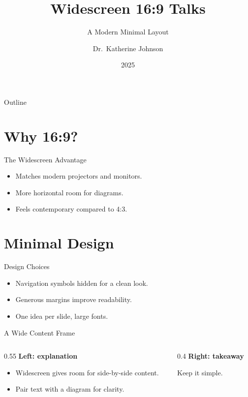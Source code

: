 \documentclass[aspectratio=169]{beamer}
\title{Widescreen 16:9 Talks}
\subtitle{A Modern Minimal Layout}
\author{Dr.~Katherine Johnson}
\institute{NASA}
\date{2025}
\begin{document}
\begin{frame}[plain]
  \titlepage
\end{frame}

\begin{frame}{Outline}
  \tableofcontents
\end{frame}

\section{Why 16:9?}

\begin{frame}{The Widescreen Advantage}
  \begin{itemize}
    \item Matches modern projectors and monitors.
    \item More horizontal room for diagrams.
    \item Feels contemporary compared to 4:3.
  \end{itemize}
\end{frame}

\section{Minimal Design}

\begin{frame}{Design Choices}
  \begin{itemize}
    \item Navigation symbols hidden for a clean look.
    \item Generous margins improve readability.
    \item One idea per slide, large fonts.
  \end{itemize}
\end{frame}

\begin{frame}{A Wide Content Frame}
  \begin{columns}[T,onlytextwidth]
    \begin{column}{0.55\textwidth}
      \textbf{Left: explanation}
      \begin{itemize}
        \item Widescreen gives room for side-by-side content.
        \item Pair text with a diagram for clarity.
      \end{itemize}
    \end{column}
    \begin{column}{0.4\textwidth}
      \textbf{Right: takeaway}
      \begin{center}
        \Large Keep it simple.
      \end{center}
    \end{column}
  \end{columns}
\end{frame}
\end{document}
